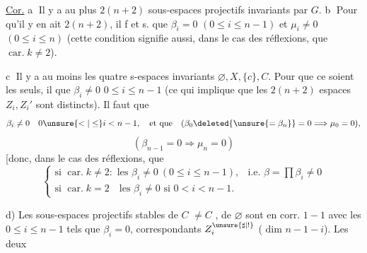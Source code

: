 \uline{Cor.} \textcircled{a} Il y a au plus $2(n+2)$ sous-espaces projectifs invariants par $G$. \textcircled{b} Pour qu'il y en ait $2(n+2)$, il f et s. que $\beta_i=0$ $(0\leq i\leq n-1)$ et $\mu_i\neq0$  $(0\leq i\leq n)$ (cette condition signifie aussi, dans le cas des réflexions, que $\operatorname{car.}k\neq2$).

\textcircled{c}  Il y a au moins les quatre s-espaces invariants $\varnothing,X,\{c\},C$. Pour que ce soient les seuls, il   que $\beta_i\neq0$ $0\leq i\leq n-1$ (ce qui implique que les $2(n+2)$ espaces $Z_i,Z_i'$ sont distincts). Il faut  que
\[
\beta_i\neq0\quad0\unsure{<|\leq}i<n-1,
\quad\text{et que}\quad
(\beta_0\deleted{\unsure{=\beta_n}}=0\Longrightarrow\mu_0=0),
\]
\[
(\beta_{n-1}=0\Longrightarrow\mu_n=0)
\]
[donc, dans le cas des réflexions, que
\[
\left\{
\begin{array}{ll}
\text{si }\operatorname{car.}k\neq2:\text{ les }\beta_i\neq0\ (0\leq i\leq n-1),
&\text{i.e. }\beta=\prod\beta_i\neq0\\
\text{si }\operatorname{car.}k=2\quad\text{les }\beta_i\neq0\text{ si }0<i<n-1.&
\end{array}
\right.
\]



d) Les sous-espaces projectifs stables de $C$ $\neq C$ , de $\varnothing$  sont en corr. $1-1$ avec les $0\leq i\leq n-1$ tels que $\beta_i=0$,   correspondants $Z_i^{\unsure{\sharp|!}}$ ( dim $n-1-i$). Les deux


